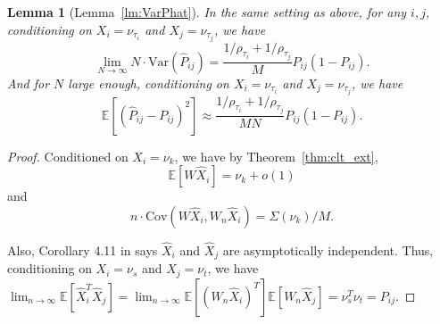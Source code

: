 \documentclass[10pt,letterpaper]{article}
\newtheorem{lemma}[fact]{Lemma}
\newcommand{\Ex}{\mathbb{E}}
\renewcommand{\hat}{\widehat}
\begin{document}
\begin{lemma}[Lemma~\ref{lm:VarPhat}]
In the same setting as above, for any $i, j$, conditioning on $X_i = \nu_{\tau_i}$ and $X_j = \nu_{\tau_j}$, we have
\[
	\lim_{N \to \infty} N \cdot \mathrm{Var}(\hat{P}_{ij}) =
    \frac{1/\rho_{\tau_i} + 1/\rho_{\tau_j}}{M} P_{ij} (1 - P_{ij}).
\]
And for $N$ large enough, conditioning on $X_i = \nu_{\tau_i}$ and $X_j = \nu_{\tau_j}$, we have
\[
	\Ex[(\hat{P}_{ij} - P_{ij})^2] \approx
    \frac{1/\rho_{\tau_i} + 1/\rho_{\tau_j}}{M N} P_{ij}(1-P_{ij}).
\]
\end{lemma}
\begin{proof}
Conditioned on $X_i = \nu_k$, we have by Theorem~\ref{thm:clt_ext},
\[
	\Ex[W \hat{X}_i] = \nu_k+o(1)
\]
and
\[
	n \cdot \mathrm{Cov}(W \hat{X}_i, W_n \hat{X}_i) = \Sigma(\nu_k)/M.
\]


Also, Corollary 4.11 in \cite{athreya2013limit} says $\hat{X}_i$ and $\hat{X}_j$ are asymptotically independent. Thus, conditioning on $X_i = \nu_s$ and $X_j = \nu_t$, we have $\lim_{n\to\infty}\Ex[\hat{X}_i^T \hat{X}_j] = \lim_{n\to\infty}\Ex[(W_n \hat{X}_i)^T] \Ex[W_n \hat{X}_j] = \nu_s^T \nu_t = P_{ij}$.


\end{proof}
\end{document}
